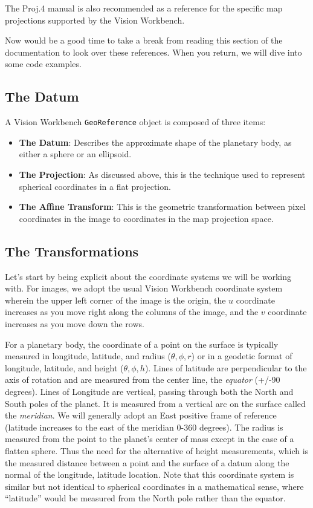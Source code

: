 The Proj.4 manual is also recommended as a reference for the specific
map projections supported by the Vision Workbench.

Now would be a good time to take a break from reading this section of
the documentation to look over these references.  When you return, we
will dive into some code examples.

\subsection{The Datum}

A Vision Workbench \verb#GeoReference# object is composed of three items:

\begin{itemize}
\item {\bf The Datum}: Describes the approximate shape of the
  planetary body, as either a sphere or an ellipsoid.
\item {\bf The Projection}: As discussed above, this is the technique
  used to represent spherical coordinates in a flat projection.
\item {\bf The Affine Transform}: This is the geometric transformation
  between pixel coordinates in the image to coordinates in the map
  projection space.
\end{itemize}

\subsection{The Transformations}

Let's start by being explicit about the coordinate systems we will be
working with.  For images, we adopt the usual Vision Workbench
coordinate system wherein the upper left corner of the image is the
origin, the $u$ coordinate increases as you move right along the
columns of the image, and the $v$ coordinate increases as you move
down the rows.

For a planetary body, the coordinate of a point on the surface is
typically measured in longitude, latitude, and radius ($\theta, \phi,
r$) or in a geodetic format of longitude, latitude, and height
($\theta, \phi, h$). Lines of latitude are perpendicular to the axis
of rotation and are measured from the center line, the {\em equator}
(+/-90 degrees).  Lines of Longitude are vertical, passing through
both the North and South poles of the planet.  It is measured from a
vertical arc on the surface called the {\em meridian}.  We will
generally adopt an East positive frame of reference (latitude
increases to the east of the meridian 0-360 degrees).  The radius is
measured from the point to the planet's center of mass except in the
case of a flatten sphere. Thus the need for the alternative of height
measurements, which is the measured distance between a point and the
surface of a datum along the normal of the longitude, latitude
location.  Note that this coordinate system is similar but not
identical to spherical coordinates in a mathematical sense, where
``latitude'' would be measured from the North pole rather than the
equator.

